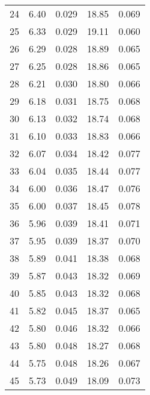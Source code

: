 \begin{table}
\begin{tabular}{c|ll|ll}
24 & 6.40 & 0.029 & 18.85 & 0.069 \\
25 & 6.33 & 0.029 & 19.11 & 0.060 \\
26 & 6.29 & 0.028 & 18.89 & 0.065 \\
27 & 6.25 & 0.028 & 18.86 & 0.065 \\
28 & 6.21 & 0.030 & 18.80 & 0.066 \\
29 & 6.18 & 0.031 & 18.75 & 0.068 \\
30 & 6.13 & 0.032 & 18.74 & 0.068 \\
31 & 6.10 & 0.033 & 18.83 & 0.066 \\
32 & 6.07 & 0.034 & 18.42 & 0.077 \\
33 & 6.04 & 0.035 & 18.44 & 0.077 \\
34 & 6.00 & 0.036 & 18.47 & 0.076 \\
35 & 6.00 & 0.037 & 18.45 & 0.078 \\
36 & 5.96 & 0.039 & 18.41 & 0.071 \\
37 & 5.95 & 0.039 & 18.37 & 0.070 \\
38 & 5.89 & 0.041 & 18.38 & 0.068 \\
39 & 5.87 & 0.043 & 18.32 & 0.069 \\
40 & 5.85 & 0.043 & 18.32 & 0.068 \\
41 & 5.82 & 0.045 & 18.37 & 0.065 \\
42 & 5.80 & 0.046 & 18.32 & 0.066 \\
43 & 5.80 & 0.048 & 18.27 & 0.068 \\
44 & 5.75 & 0.048 & 18.26 & 0.067 \\
45 & 5.73 & 0.049 & 18.09 & 0.073 \\
               \hline
        \end{tabular}
    \end{table}
    \clearpage


